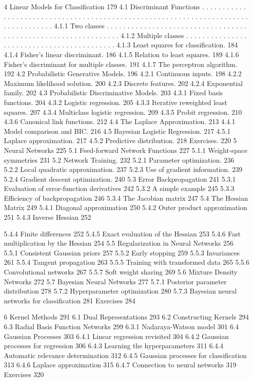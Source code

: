 \documentclass[
  10
]{article}
\begin{document}
4 Linear Models for Classification 179 4.1 Discriminant Functions . . .
. . . . . . . . . . . . . . . . . . . . . . . . . . . . . . . . . . . .
. . . . . . . . . . . . . . . . . . . . . . . . . . . . . . . . . . . .
. . . . . . . 4.1.1 Two classes . . . . . . . . . . . . . . . . . . . .
. . . . . . . . . . . . . . . . . . . . . . . . . . . . . . . . . . . .
. . . . . . 4.1.2 Multiple classes . . . . . . . . . . . . . . . . . . .
. . . . . . . . . . . . . . . . . . . . . . . 4.1.3 Least squares for
classification. 184 4.1.4 Fisher's linear discriminant. 186 4.1.5
Relation to least squares. 189 4.1.6 Fisher's discriminant for multiple
classes. 191 4.1.7 The perceptron algorithm. 192 4.2 Probabilistic
Generative Models. 196 4.2.1 Continuous inputs. 198 4.2.2 Maximum
likelihood solution. 200 4.2.3 Discrete features. 202 4.2.4 Exponential
family. 202 4.3 Probabilistic Discriminative Models. 203 4.3.1 Fixed
basis functions. 204 4.3.2 Logistic regression. 205 4.3.3 Iterative
reweighted least squares. 207 4.3.4 Multiclass logistic regression. 209
4.3.5 Probit regression. 210 4.3.6 Canonical link functions. 212 4.4 The
Laplace Approximation. 213 4.4.1 Model comparison and BIC. 216 4.5
Bayesian Logistic Regression. 217 4.5.1 Laplace approximation. 217 4.5.2
Predictive distribution. 218 Exercises. 220 5 Neural Networks 225 5.1
Feed-forward Network Functions 227 5.1.1 Weight-space symmetries 231 5.2
Network Training. 232 5.2.1 Parameter optimization. 236 5.2.2 Local
quadratic approximation. 237 5.2.3 Use of gradient information. 239
5.2.4 Gradient descent optimization. 240 5.3 Error Backpropagation 241
5.3.1 Evaluation of error-function derivatives 242 5.3.2 A simple
example 245 5.3.3 Efficiency of backpropagation 246 5.3.4 The Jacobian
matrix 247 5.4 The Hessian Matrix 249 5.4.1 Diagonal approximation 250
5.4.2 Outer product approximation 251 5.4.3 Inverse Hessian 252

5.4.4 Finite differences 252 5.4.5 Exact evaluation of the Hessian 253
5.4.6 Fast multiplication by the Hessian 254 5.5 Regularization in
Neural Networks 256 5.5.1 Consistent Gaussian priors 257 5.5.2 Early
stopping 259 5.5.3 Invariances 261 5.5.4 Tangent propagation 263 5.5.5
Training with transformed data 265 5.5.6 Convolutional networks 267
5.5.7 Soft weight sharing 269 5.6 Mixture Density Networks 272 5.7
Bayesian Neural Networks 277 5.7.1 Posterior parameter distribution 278
5.7.2 Hyperparameter optimization 280 5.7.3 Bayesian neural networks for
classification 281 Exercises 284

6 Kernel Methods 291 6.1 Dual Representations 293 6.2 Constructing
Kernels 294 6.3 Radial Basis Function Networks 299 6.3.1 Nadaraya-Watson
model 301 6.4 Gaussian Processes 303 6.4.1 Linear regression revisited
304 6.4.2 Gaussian processes for regression 306 6.4.3 Learning the
hyperparameters 311 6.4.4 Automatic relevance determination 312 6.4.5
Gaussian processes for classification 313 6.4.6 Laplace approximation
315 6.4.7 Connection to neural networks 319 Exercises 320
\end{document}
